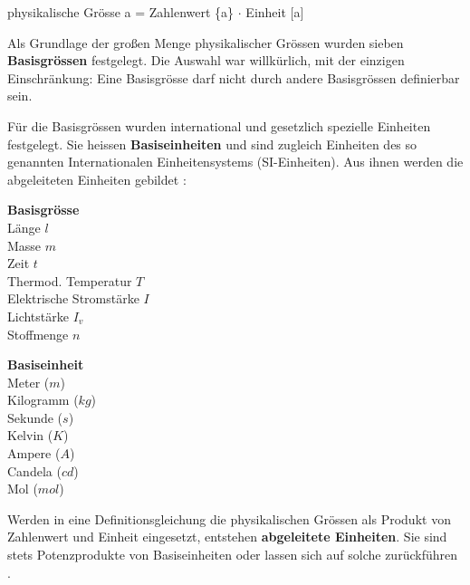 \begin{infobox}
    physikalische Grösse a = Zahlenwert \{a\} $\cdot$ Einheit [a]
\end{infobox}

Als Grundlage der großen Menge physikalischer
Grössen wurden sieben \textbf{Basisgrössen} festgelegt. Die
Auswahl war willkürlich, mit der einzigen Einschränkung: 
Eine Basisgrösse darf nicht durch
andere Basisgrössen definierbar sein.

Für die Basisgrössen wurden international und gesetzlich 
spezielle Einheiten festgelegt. Sie heissen
\textbf{Basiseinheiten} und sind zugleich Einheiten des
so genannten Internationalen Einheitensystems
(SI-Einheiten). Aus ihnen werden die abgeleiteten
Einheiten gebildet \cite{boge_physik_2008}:

\begin{infobox}
    \begin{minipage}{.3\textwidth}
        \textbf{Basisgrösse} \\
        Länge $l$ \\
        Masse $m$ \\
        Zeit $t$ \\
        Thermod. Temperatur $T$ \\
        Elektrische Stromstärke $I$ \\
        Lichtstärke $I_v$ \\
        Stoffmenge $n$
    \end{minipage}
    \hspace{.1\textwidth}
    \begin{minipage}{.3\textwidth}
        \textbf{Basiseinheit} \\
        Meter ($m$) \\
        Kilogramm ($kg$) \\
        Sekunde ($s$) \\
        Kelvin ($K$) \\
        Ampere ($A$) \\
        Candela ($cd$) \\
        Mol ($mol$)
    \end{minipage}
\end{infobox}

Werden in eine Definitionsgleichung die physikalischen Grössen 
als Produkt von Zahlenwert und
Einheit eingesetzt, entstehen \textbf{abgeleitete Einheiten}. 
Sie sind stets Potenzprodukte von Basiseinheiten 
oder lassen sich auf solche zurückführen \cite{boge_physik_2008}.

